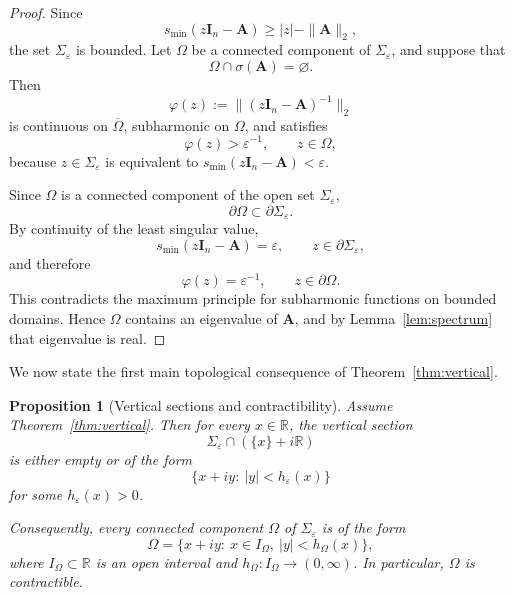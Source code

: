 \documentclass[11pt]{article}
\numberwithin{equation}{section}
\newtheorem{proposition}[theorem]{Proposition}
\newcommand{\R}{\mathbb R}
\newcommand{\A}{\mathbf A}
\newcommand{\I}{\mathbf I}
\newcommand{\smin}{s_{\min}}
\begin{document}
\begin{proof}
Since
\[
\smin(z\I_n-\A)\ge |z|-\|\A\|_2,
\]
the set \(\Sigma_\varepsilon\) is bounded. Let \(\Omega\) be a connected component of
\(\Sigma_\varepsilon\), and suppose that
\[
\Omega\cap\sigma(\A)=\varnothing.
\]
Then
\[
\varphi(z):=\|(z\I_n-\A)^{-1}\|_2
\]
is continuous on \(\overline\Omega\), subharmonic on \(\Omega\), and satisfies
\[
\varphi(z)>\varepsilon^{-1},
\qquad z\in\Omega,
\]
because \(z\in\Sigma_\varepsilon\) is equivalent to \(\smin(z\I_n-\A)<\varepsilon\).

Since \(\Omega\) is a connected component of the open set \(\Sigma_\varepsilon\),
\[
\partial\Omega\subset\partial\Sigma_\varepsilon.
\]
By continuity of the least singular value,
\[
\smin(z\I_n-\A)=\varepsilon,
\qquad z\in\partial\Sigma_\varepsilon,
\]
and therefore
\[
\varphi(z)=\varepsilon^{-1},
\qquad z\in\partial\Omega.
\]
This contradicts the maximum principle for subharmonic functions on bounded
domains.  Hence \(\Omega\) contains an eigenvalue of \(\A\), and by
Lemma~\ref{lem:spectrum} that eigenvalue is real.
\end{proof}

We now state the first main topological consequence of
Theorem~\ref{thm:vertical}.

\begin{proposition}[Vertical sections and contractibility]
\label{prop:topological-reduction}
Assume Theorem~\ref{thm:vertical}.  Then for every \(x\in\R\), the vertical section
\[
\Sigma_\varepsilon\cap(\{x\}+i\R)
\]
is either empty or of the form
\[
\{x+iy:\ |y|<h_\varepsilon(x)\}
\]
for some \(h_\varepsilon(x)>0\).

Consequently, every connected component \(\Omega\) of \(\Sigma_\varepsilon\) is of the
form
\[
\Omega
=
\{x+iy:\ x\in I_\Omega,\ |y|<h_\Omega(x)\},
\]
where \(I_\Omega\subset\R\) is an open interval and \(h_\Omega:I_\Omega\to(0,\infty)\).
In particular, \(\Omega\) is contractible.
\end{proposition}
\end{document}
